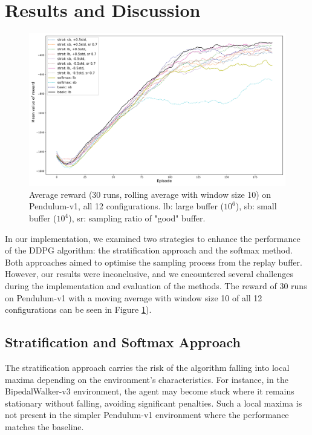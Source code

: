 \documentclass{article}
\begin{document}
\section{Results and Discussion}
\begin{figure}[h]

	\centering
	\includegraphics[scale = 0.32]{figures/performance.pdf}
    \caption{Average reward (30 runs, rolling average with window size 10) on Pendulum-v1, all 12 configurations. lb: large buffer ($10^6$), sb: small buffer ($10^4$), sr: sampling ratio of "good" buffer.}
	\label{fig:3}

\end{figure}

In our implementation, we examined two strategies to enhance the performance of the DDPG algorithm: the stratification approach and the softmax method. Both approaches aimed to optimise the sampling process from the replay buffer. However, our results were inconclusive, and we encountered several challenges during the implementation and evaluation of the methods. The reward of 30 runs on Pendulum-v1 with a moving average with window size 10 of all 12 configurations can be seen in Figure \ref{fig:3}).

\subsection{Stratification and Softmax Approach}
The stratification approach carries the risk of the algorithm falling into local maxima depending on the environment's characteristics. For instance, in the BipedalWalker-v3 environment, the agent may become stuck where it remains stationary without falling, avoiding significant penalties. Such a local maxima is not present in the simpler Pendulum-v1 environment where the performance matches the baseline.
\end{document}

